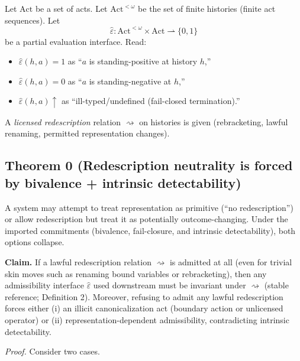 \documentclass[12pt]{article}
\theoremstyle{plain}
\begin{document}
Let $\mathrm{Act}$ be a set of acts. Let $\mathrm{Act}^{<\omega}$ be the set of finite histories (finite act sequences). Let
\[
\widehat\varepsilon:\mathrm{Act}^{<\omega}\times \mathrm{Act}\rightharpoonup \{0,1\}
\]
be a partial evaluation interface. Read:

\begin{itemize}[leftmargin=*]
\item $\widehat\varepsilon(h,a)=1$ as ``$a$ is standing-positive at history $h$,''
\item $\widehat\varepsilon(h,a)=0$ as ``$a$ is standing-negative at $h$,''
\item $\widehat\varepsilon(h,a)\uparrow$ as ``ill-typed/undefined (fail-closed termination).''
\end{itemize}

A \emph{licensed redescription} relation $\rightsquigarrow$ on histories is given (rebracketing, lawful renaming, permitted representation changes).


\subsection{Theorem 0 (Redescription neutrality is forced by bivalence + intrinsic detectability)}

A system may attempt to treat representation as primitive (``no redescription'') or allow redescription but treat it as potentially outcome-changing. Under the imported commitments (bivalence, fail-closure, and intrinsic detectability), both options collapse.

\medskip

\noindent\textbf{Claim.} If a lawful redescription relation $\rightsquigarrow$ is admitted at all (even for trivial skin moves such as renaming bound variables or rebracketing), then any admissibility interface $\widehat\varepsilon$ used downstream must be invariant under $\rightsquigarrow$ (stable reference; Definition 2). Moreover, refusing to admit any lawful redescription forces either (i) an illicit canonicalization act (boundary action or unlicensed operator) or (ii) representation-dependent admissibility, contradicting intrinsic detectability.

\textit{Proof.} Consider two cases.
\end{document}

